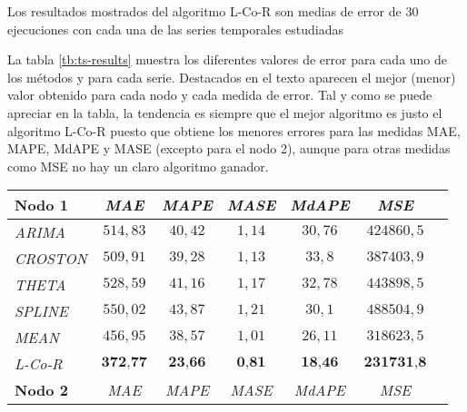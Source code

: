 \documentclass[runningheads]{llncs}
\begin{document}
Los resultados mostrados del algoritmo L-Co-R son medias de
error de 30 ejecuciones con cada una de las series temporales estudiadas

La tabla \ref{tb:ts-results} muestra los diferentes valores de error para cada uno de los métodos y
para cada serie. Destacados en el texto aparecen el mejor (menor) valor obtenido para cada nodo y
cada medida de error. Tal y como se puede apreciar en la tabla, la tendencia es siempre que el
mejor algoritmo es justo el algoritmo L-Co-R puesto que obtiene los menores errores para las
medidas MAE, MAPE, MdAPE y MASE (excepto para el nodo 2), aunque para otras medidas como MSE no hay
un claro algoritmo ganador. 

\begin{table} \footnotesize
 \begin{center}
 \begin{tabular}{|l|c|c|c|c|c|c|}

\hline 
 \textbf{Nodo 1}& \emph{MAE} & \emph{MAPE} & \emph{MASE} & \emph{MdAPE} & \emph{MSE} \\%
\hline

\emph{ARIMA } & $514,83$ & $40,42$ & $1,14$ & $30,76$ & $424860,5$ \\%
\emph{CROSTON } & $509,91$ & $39,28$ & $1,13$ & $33,8$ & $387403,9$ \\%
\emph{THETA } & $528,59$ & $41,16$ & $1,17$ & $32,78$ & $443898,5$ \\%
\emph{SPLINE } & $550,02$ & $43,87$ & $1,21$ & $30,1$ & $488504,9$ \\%
\emph{MEAN } & $456,95$ & $38,57$ & $1,01$ & $26,11$ & $318623,5$ \\%
\emph{L-Co-R} & $\textbf{372,77}$ & $\textbf{23,66}$ & $\textbf{0,81}$ & $\textbf{18,46}$ &
$\textbf{231731,8}$ \\%
\hline 
 \hline 
\textbf{Nodo 2} & \emph{MAE} & \emph{MAPE} & \emph{MASE} & \emph{MdAPE} & \emph{MSE} \\%
\hline


\end{tabular}
\end{center}
\end{table}
\end{document}
